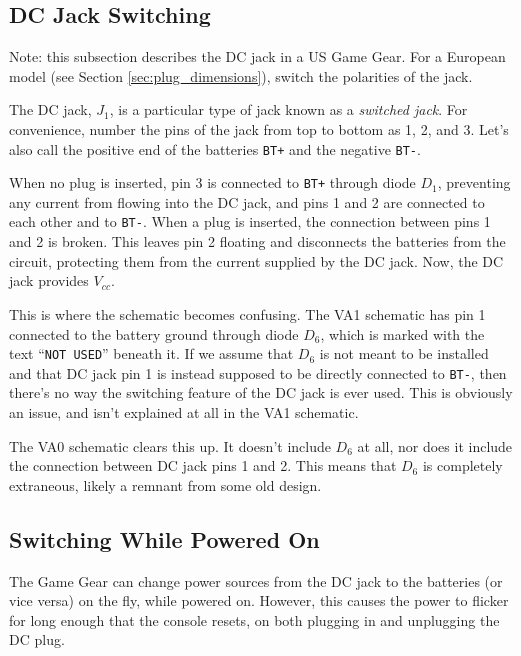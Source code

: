 \documentclass{article}
\newcommand{\Vcc}{$V_{cc}$}
\newcommand{\chippin}{\texttt}
\newcommand{\model}{\textsf}
\begin{document}
\subsection{DC Jack Switching}
\label{sec:jack_switching}
Note: this subsection describes the DC jack in a US Game Gear. For a
European model (see Section \ref{sec:plug_dimensions}), switch the
polarities of the jack.

The DC jack, $J_1$, is a particular type of jack known as a
\textit{switched jack}. For convenience, number the pins of the jack
from top to bottom as 1, 2, and 3. Let's also call the positive end of
the batteries \chippin{BT+} and the negative \chippin{BT-}.

When no plug is inserted, pin 3 is connected to \chippin{BT+} through
diode $D_1$, preventing any current from flowing into the DC jack, and
pins 1 and 2 are connected to each other and to \chippin{BT-}. When a
plug is inserted, the connection between pins 1 and 2 is broken. This
leaves pin 2 floating and disconnects the batteries from the circuit,
protecting them from the current supplied by the DC jack. Now, the DC
jack provides \Vcc{}.

This is where the schematic becomes confusing. The \model{VA1}
schematic has pin 1 connected to the battery ground through diode
$D_6$, which is marked with the text ``\texttt{NOT USED}'' beneath
it. If we assume that $D_6$ is not meant to be installed and that DC
jack pin 1 is instead supposed to be directly connected to
\chippin{BT-}, then there's no way the switching feature of the DC
jack is ever used. This is obviously an issue, and isn't explained at
all in the \model{VA1} schematic.

The \model{VA0} schematic clears this up. It doesn't include $D_6$ at
all, nor does it include the connection between DC jack pins 1 and
2. This means that $D_6$ is completely extraneous, likely a remnant
from some old design.

\subsection{Switching While Powered On}
The Game Gear can change power sources from the DC jack to the
batteries (or vice versa) on the fly, while powered on. However, this
causes the power to flicker for long enough that the console resets,
on both plugging in and unplugging the DC plug.
\end{document}
